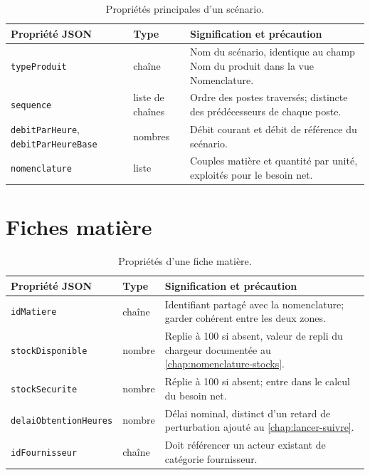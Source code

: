 \begin{table}[H]
  \centering
  \small
  \begin{tabularx}{\textwidth}{L{0.20\textwidth} L{0.10\textwidth} Y}
    \toprule
    Propriété JSON & Type & Signification et précaution \\
    \midrule
    \texttt{typeProduit} & chaîne & Nom du scénario, identique au champ Nom du produit dans la vue Nomenclature. \\
    \texttt{sequence} & liste de chaînes & Ordre des postes traversés; distincte des prédécesseurs de chaque poste. \\
    \texttt{debitParHeure}, \texttt{debitParHeureBase} & nombres & Débit courant et débit de référence du scénario. \\
    \texttt{nomenclature} & liste & Couples matière et quantité par unité, exploités pour le besoin net. \\
    \bottomrule
  \end{tabularx}
  \caption{Propriétés principales d'un scénario.}
  \label{tab:json-scenarios}
\end{table}

\section{Fiches matière}

\begin{table}[H]
  \centering
  \small
  \begin{tabularx}{\textwidth}{L{0.24\textwidth} L{0.10\textwidth} Y}
    \toprule
    Propriété JSON & Type & Signification et précaution \\
    \midrule
    \texttt{idMatiere} & chaîne & Identifiant partagé avec la nomenclature; garder cohérent entre les deux zones. \\
    \texttt{stockDisponible} & nombre & Replie à 100 si absent, valeur de repli du chargeur documentée au \cref{chap:nomenclature-stocks}. \\
    \texttt{stockSecurite} & nombre & Réplie à 100 si absent; entre dans le calcul du besoin net. \\
    \texttt{delaiObtentionHeures} & nombre & Délai nominal, distinct d'un retard de perturbation ajouté au \cref{chap:lancer-suivre}. \\
    \texttt{idFournisseur} & chaîne & Doit référencer un acteur existant de catégorie fournisseur. \\
    \bottomrule
  \end{tabularx}
  \caption{Propriétés d'une fiche matière.}
  \label{tab:json-fiches-matiere}
\end{table}

